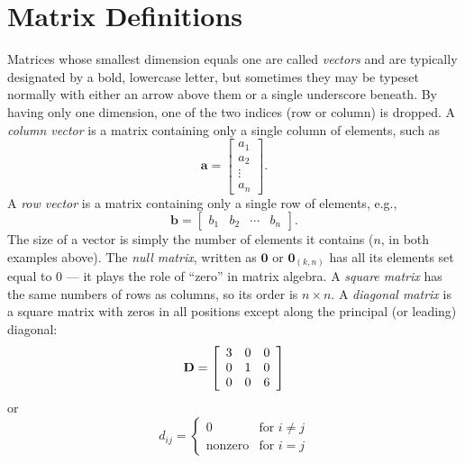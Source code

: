 \section{Matrix Definitions}

Matrices whose smallest dimension equals one are called \emph{vectors} and are typically designated
by a bold, lowercase letter, but sometimes they may be typeset normally with either an
arrow above them or a single underscore beneath. By having only one dimension, one of the two indices (row or column) is dropped.
A \emph{column vector} is a matrix containing only a single column of elements, such as
\begin{equation}
\mathbf{a} = \left[ \begin{array}{c}
a_1\\
a_2\\
\vdots\\
a_n
\end{array}  \right] . 
\end{equation}
\noindent
A \emph{row vector} is a matrix containing only a single row of elements, e.g.,
\begin{equation}
\mathbf{b} = \left[ \begin{array}{cccc}
b_1 & b_2 & \cdots & b_n
\end{array}  \right] .
\end{equation}
The size of a vector is simply the number of elements it contains ($n$, in both examples above).
The \emph{null matrix}, written as $\mathbf{0}$ or $\mathbf{0}_{(k,n)}$ has all its elements set equal to 0 --- it plays the
role of ``zero'' in matrix algebra.
A \emph{square matrix} has the same numbers of rows as columns, so its order is $n \times n$.
A \emph{diagonal matrix} is a square matrix with zeros in all positions except along the principal (or 
leading) diagonal:
\begin{equation}
	\index{Diagonal matrix}
	\index{Matrix!diagonal}
\mathbf{D} = \left[ 
\begin{array}{ccc}
3 & 0 & 0 \\
0 & 1 & 0\\
0 & 0 & 6
\end{array} \right]	 
\end{equation}
or
\begin{equation}
d_{ij} = \left \{ \begin{array}{cl}
0 & \mbox{for } i \neq j\\
\mbox{nonzero} & \mbox{for } i = j 
\end{array} \right.
\end{equation}	 
